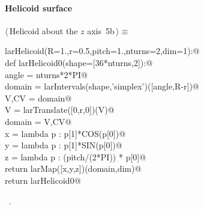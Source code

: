 \documentclass[11pt,oneside]{article}	%
\begin{document}
\paragraph{Helicoid surface}
\begin{flushleft} \small \label{scrap8}
\protect{}$\langle\,$Helicoid about the $z$ axis\nobreak\ {\footnotesize 5b}$\,\rangle\equiv$
\vspace{-1ex}
\begin{list}{}{} \item
\mbox{}\verb@def larHelicoid(R=1.,r=0.5,pitch=1.,nturns=2,dim=1):@\\
\mbox{}\verb@   def larHelicoid0(shape=[36*nturns,2]):@\\
\mbox{}\verb@      angle = nturns*2*PI@\\
\mbox{}\verb@      domain = larIntervals(shape,'simplex')([angle,R-r])@\\
\mbox{}\verb@      V,CV = domain@\\
\mbox{}\verb@      V = larTranslate([0,r,0])(V)@\\
\mbox{}\verb@      domain = V,CV@\\
\mbox{}\verb@      x = lambda p : p[1]*COS(p[0])@\\
\mbox{}\verb@      y = lambda p : p[1]*SIN(p[0])@\\
\mbox{}\verb@      z = lambda p : (pitch/(2*PI)) * p[0]@\\
\mbox{}\verb@      return larMap([x,y,z])(domain,dim)@\\
\mbox{}\verb@   return larHelicoid0@\\
\mbox{}\verb@@{\NWsep}
\end{list}
\vspace{-1ex}
\footnotesize\addtolength{\baselineskip}{-1ex}
\begin{list}{}{\setlength{\itemsep}{-\parsep}\setlength{\itemindent}{-\leftmargin}}
\item \NWtxtMacroRefIn\ .
\end{list}
\end{flushleft}
\end{document}
